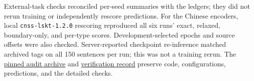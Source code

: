 External-task checks reconciled per-seed summaries with the ledgers; they did not rerun training or independently rescore predictions. For the Chinese encoders, local \texttt{cnss-lskt-1.2.0} rescoring reproduced all six runs' exact, relaxed, boundary-only, and per-type scores. Development-selected epochs and source offsets were also checked. Server-reported checkpoint re-inference matched archived tags on all 150 sentences per run; this was not a training rerun. The \href{https://github.com/AlfredJamesLi/chinese-skillspan-benchmark/tree/0c73207c0f9b00fa87f385b78bcb7342bd00bfcb/results_snapshots/table11_evidence_20260924}{pinned audit archive} and \href{https://github.com/AlfredJamesLi/chinese-skillspan-benchmark/blob/main/reproduction/evidence_review_20260925/README.md}{verification record} preserve code, configurations, predictions, and the detailed checks.


\FloatBarrier

\FloatBarrier
